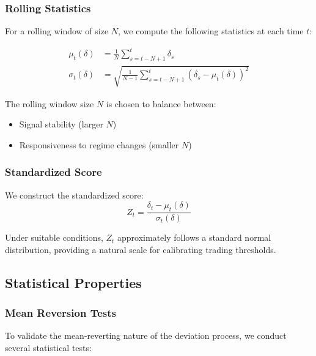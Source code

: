\subsubsection{Rolling Statistics}
For a rolling window of size $N$, we compute the following statistics at each time $t$:

\begin{equation}
\begin{aligned}
    \mu_t(\delta) &= \frac{1}{N}\sum_{s=t-N+1}^t \delta_s \\
    \sigma_t(\delta) &= \sqrt{\frac{1}{N-1}\sum_{s=t-N+1}^t (\delta_s - \mu_t(\delta))^2}
\end{aligned}
\end{equation}

The rolling window size $N$ is chosen to balance between:
\begin{itemize}
    \item Signal stability (larger $N$)
    \item Responsiveness to regime changes (smaller $N$)
\end{itemize}

\subsubsection{Standardized Score}
We construct the standardized score:
\begin{equation}
    Z_t = \frac{\delta_t - \mu_t(\delta)}{\sigma_t(\delta)}
\end{equation}

Under suitable conditions, $Z_t$ approximately follows a standard normal distribution, providing a natural scale for calibrating trading thresholds.

\subsection{Statistical Properties}

\subsubsection{Mean Reversion Tests}
To validate the mean-reverting nature of the deviation process, we conduct several statistical tests:

